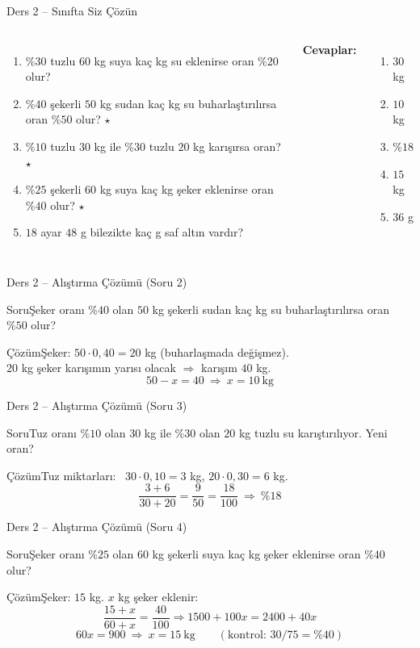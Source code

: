 \documentclass[aspectratio=169,11pt]{beamer}
\newcommand{\soru}[3]{%
\begin{frame}{#1}
  \begin{block}{Soru}\large #2\end{block}
  \pause
  \begin{exampleblock}{Çözüm}\large #3\end{exampleblock}
\end{frame}}
\begin{document}
\begin{frame}{Ders 2 -- Sınıfta Siz Çözün}
\begin{columns}[t]
\begin{enumerate}
\item \(\%30\) tuzlu \(60\) kg suya kaç kg su eklenirse oran \(\%20\) olur?
\item \(\%40\) şekerli \(50\) kg sudan kaç kg su buharlaştırılırsa oran \(\%50\) olur? \(\star\)
\item \(\%10\) tuzlu \(30\) kg ile \(\%30\) tuzlu \(20\) kg karışırsa oran? \(\star\)
\item \(\%25\) şekerli \(60\) kg suya kaç kg şeker eklenirse oran \(\%40\) olur? \(\star\)
\item \(18\) ayar \(48\) g bilezikte kaç g saf altın vardır?
\end{enumerate}
\pause
\textbf{Cevaplar:}
\begin{enumerate}
\item \(30\) kg
\item \(10\) kg
\item \(\%18\)
\item \(15\) kg
\item \(36\) g
\end{enumerate}
\end{columns}
\vspace{4pt}{\footnotesize \(\star\) işaretli soruların adım adım çözümü sonraki slaytlardadır.}
\end{frame}

\soru{Ders 2 -- Alıştırma Çözümü (Soru 2)}
{Şeker oranı \(\%40\) olan \(50\) kg şekerli sudan kaç kg su buharlaştırılırsa oran \(\%50\) olur?}
{Şeker: \(50\cdot 0{,}40=20\) kg (buharlaşmada değişmez).\\[3pt]
\(20\) kg şeker karışımın yarısı olacak \(\Rightarrow\) karışım \(40\) kg.
\[50-x=40\ \Rightarrow\ x=10\ \text{kg}\]}

\soru{Ders 2 -- Alıştırma Çözümü (Soru 3)}
{Tuz oranı \(\%10\) olan \(30\) kg ile \(\%30\) olan \(20\) kg tuzlu su karıştırılıyor. Yeni oran?}
{Tuz miktarları: \ \(30\cdot 0{,}10=3\) kg, \quad \(20\cdot 0{,}30=6\) kg.
\[\frac{3+6}{30+20}=\frac{9}{50}=\frac{18}{100}\ \Rightarrow\ \%18\]}

\soru{Ders 2 -- Alıştırma Çözümü (Soru 4)}
{Şeker oranı \(\%25\) olan \(60\) kg şekerli suya kaç kg şeker eklenirse oran \(\%40\) olur?}
{Şeker: \(15\) kg. \(x\) kg şeker eklenir:
\[\frac{15+x}{60+x}=\frac{40}{100}\Rightarrow 1500+100x=2400+40x\]
\[60x=900\ \Rightarrow\ x=15\ \text{kg}\qquad(\text{kontrol: } 30/75=\%40)\]}
\end{document}
